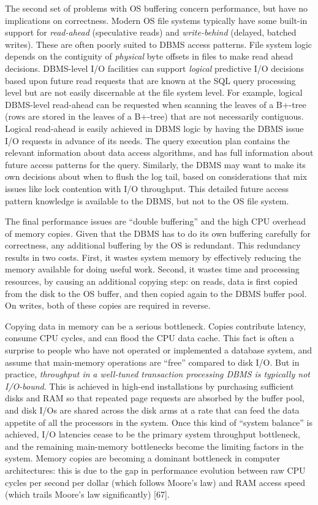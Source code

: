 \documentclass[a4paper,11pt,twoside,openright]{book}
\begin{document}
The second set of problems with OS buffering concern performance, but
have no implications on correctness. Modern OS file systems typically
have some built-in support for \emph{read-ahead} (speculative reads) and
\emph{write-behind} (delayed, batched writes). These are often poorly
suited to DBMS access patterns. File system logic depends on the
contiguity of \emph{physical} byte offsets in files to make read ahead
decisions. DBMS-level I/O facilities can support \emph{logical}
predictive I/O decisions based upon future read requests that are known
at the SQL query processing level but are not easily discernable at the
file system level. For example, logical DBMS-level read-ahead can be
requested when scanning the leaves of a B+-tree (rows are stored in the
leaves of a B+-tree) that are not necessarily contiguous. Logical
read-ahead is easily achieved in DBMS logic by having the DBMS issue I/O
requests in advance of its needs. The query execution plan contains the
relevant information about data access algorithms, and has full
information about future access patterns for the query. Similarly, the
DBMS may want to make its own decisions about when to flush the log
tail, based on considerations that mix issues like lock contention with
I/O throughput. This detailed future access pattern knowledge is
available to the DBMS, but not to the OS file system.

The final performance issues are ``double buffering'' and the high CPU
overhead of memory copies\emph{.} Given that the DBMS has to do its own
buffering carefully for correctness, any additional buffering by the OS
is redundant. This redundancy results in two costs. First, it wastes
system memory by effectively reducing the memory available for doing
useful work. Second, it wastes time and processing resources, by causing
an additional copying step: on reads, data is first copied from the disk
to the OS buffer, and then copied again to the DBMS buffer pool. On
writes, both of these copies are required in reverse.

Copying data in memory can be a serious bottleneck. Copies contribute
latency, consume CPU cycles, and can flood the CPU data cache. This fact
is often a surprise to people who have not operated or implemented a
database system, and assume that main-memory operations are ``free''
compared to disk I/O. But in practice, \emph{throughput in} \emph{a
well-tuned transaction processing DBMS is typically not I/O-bound}. This
is achieved in high-end installations by purchasing sufficient disks and
RAM so that repeated page requests are absorbed by the buffer pool, and
disk I/Os are shared across the disk arms at a rate that can feed the
data appetite of all the processors in the system. Once this kind of
``system balance'' is achieved, I/O latencies cease to be the primary
system throughput bottleneck, and the remaining main-memory bottlenecks
become the limiting factors in the system. Memory copies are becoming a
dominant bottleneck in computer architectures: this is due to the gap in
performance evolution between raw CPU cycles per second per dollar
(which follows Moore's law) and RAM access speed (which trails Moore's
law significantly) {[}67{]}.
\end{document}
